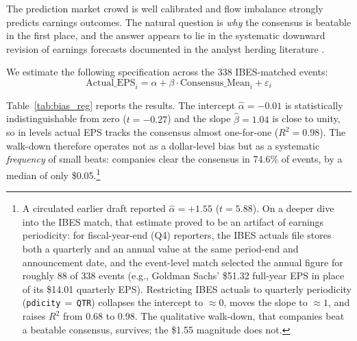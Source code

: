 \documentclass[11pt]{article}
\begin{document}
The prediction market crowd is well calibrated and flow imbalance strongly predicts earnings outcomes. The natural question is \textit{why} the consensus is beatable in the first place, and the answer appears to lie in the systematic downward revision of earnings forecasts documented in the analyst herding literature \citep{richardson2004walk, hong2000security}.

We estimate the following specification across the 338 IBES-matched events:
\begin{equation}
\text{Actual\_EPS}_i = \alpha + \beta \cdot \text{Consensus\_Mean}_i + \varepsilon_i
\end{equation}

Table~\ref{tab:bias_reg} reports the results. The intercept $\hat{\alpha} = -0.01$ is statistically indistinguishable from zero ($t = -0.27$) and the slope $\hat{\beta} = 1.04$ is close to unity, so in levels actual EPS tracks the consensus almost one-for-one ($R^2 = 0.98$). The walk-down therefore operates not as a dollar-level bias but as a systematic \textit{frequency} of small beats: companies clear the consensus in 74.6\% of events, by a median of only \$0.05.\footnote{A circulated earlier draft reported $\hat{\alpha} = +1.55$ ($t = 5.88$). On a deeper dive into the IBES match, that estimate proved to be an artifact of earnings periodicity: for fiscal-year-end (Q4) reporters, the IBES actuals file stores both a quarterly and an annual value at the same period-end and announcement date, and the event-level match selected the annual figure for roughly 88 of 338 events (e.g., Goldman Sachs' \$51.32 full-year EPS in place of its \$14.01 quarterly EPS). Restricting IBES actuals to quarterly periodicity (\texttt{pdicity}\,$=$\,\texttt{QTR}) collapses the intercept to $\approx 0$, moves the slope to $\approx 1$, and raises $R^2$ from 0.68 to 0.98. The qualitative walk-down, that companies beat a beatable consensus, survives; the \$1.55 magnitude does not.}
\end{document}
